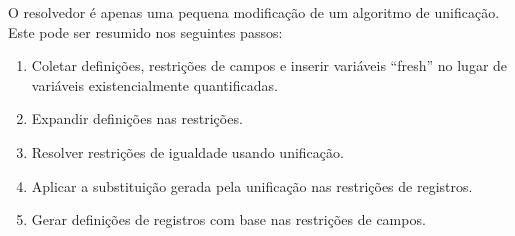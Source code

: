 \documentclass[a4paper,8pt]{article}
\begin{document}
     O resolvedor é apenas uma pequena modificação de um algoritmo de
     unificação. Este pode ser resumido nos seguintes passos:
     \begin{enumerate}
          \item Coletar definições, restrições de campos e inserir
            variáveis ``fresh'' no lugar de variáveis existencialmente
            quantificadas.
          \item Expandir definições nas restrições.
          \item Resolver restrições de igualdade usando unificação.
          \item Aplicar a substituição gerada pela unificação nas
            restrições de registros.
          \item Gerar definições de registros com base nas restrições
            de campos.
     \end{enumerate}













\end{document}
